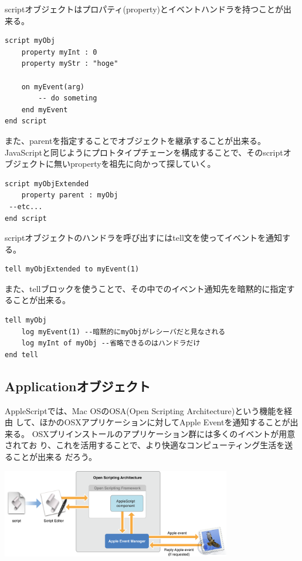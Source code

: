 \documentclass[a4paper,7pt]{jsarticle}
\begin{document}
scriptオブジェクトはプロパティ(property)とイベントハンドラを持つことが出
来る。

\begin{lstlisting}
script myObj
	property myInt : 0
	property myStr : "hoge"
	
	on myEvent(arg)
		-- do someting
	end myEvent
end script
\end{lstlisting}
また、parentを指定することでオブジェクトを継承することが出来る。
JavaScriptと同じようにプロトタイプチェーンを構成することで、そのscriptオ
ブジェクトに無いpropertyを祖先に向かって探していく。

\begin{lstlisting}
script myObjExtended
	property parent : myObj
 --etc...
end script
\end{lstlisting}

scriptオブジェクトのハンドラを呼び出すにはtell文を使ってイベントを通知す
る。

\begin{lstlisting}
tell myObjExtended to myEvent(1)
\end{lstlisting}
また、tellブロックを使うことで、その中でのイベント通知先を暗黙的に指定す
ることが出来る。
\begin{lstlisting}
tell myObj
	log myEvent(1) --暗黙的にmyObjがレシーバだと見なされる
	log myInt of myObj --省略できるのはハンドラだけ
end tell
\end{lstlisting}

\newpage

\subsection{Applicationオブジェクト}
AppleScriptでは、Mac OSのOSA(Open Scripting Architecture)という機能を経由
して、ほかのOSXアプリケーションに対してApple Eventを通知することが出来る。
OSXプリインストールのアプリケーション群には多くのイベントが用意されてお
り、これを活用することで、より快適なコンピューティング生活を送ることが出来る
だろう。

\begin{center}
\includegraphics[width=10cm]{osa.png}\\ 
\end{center}
\end{document}
